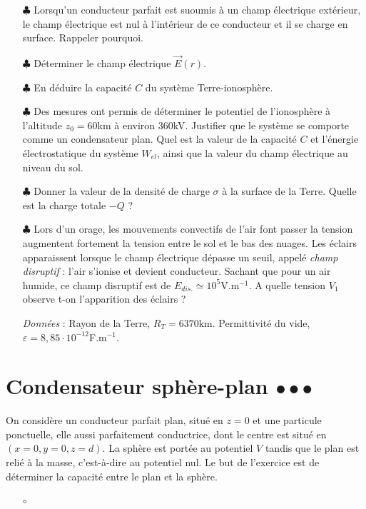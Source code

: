 \documentclass{report}
\begin{document}
\begin{itemize}

	\item[$\clubsuit$] Lorsqu'un conducteur parfait est suoumis à un champ électrique extérieur, le champ électrique est nul à l'intérieur de ce conducteur et il se charge en surface. Rappeler pourquoi.
	
	\item[$\clubsuit$] Déterminer le champ électrique $\vec{E}(r)$.
		
	\item[$\clubsuit$] En déduire la capacité $C$ du système Terre-ionosphère.
	
	\item[$\clubsuit$] Des mesures ont permis de déterminer le potentiel de l'ionosphère à l'altitude $z_0=60$km à environ 360kV. Justifier que le système se comporte comme un condensateur plan. Quel est la valeur de la capacité $C$ et l'énergie électrostatique du système $W_{el}$, ainsi que la valeur du champ électrique au niveau du sol.
	
	\item[$\clubsuit$] Donner la valeur de la densité de charge $\sigma$ à la surface de la Terre. Quelle est la charge totale $-Q$ ?
	
	\item[$\clubsuit$] Lors d'un orage, les mouvements convectifs de l'air font passer la tension augmentent fortement la tension entre le sol et le bas des nuages. Les éclairs apparaissent lorsque le champ électrique dépasse un seuil, appelé \textit{champ disruptif} : l'air s'ionise et devient conducteur. Sachant que pour un air humide, ce champ disruptif est de $E_{dis.}\simeq10^{5}$V.m$^{-1}$. A quelle tension $V_1$ observe t-on l'apparition des éclairs ?
	
	
	\textit{Données} : Rayon de la Terre, $R_T=6370$km. Permittivité du vide, $\varepsilon=8,85\cdot10^{-12}$F.m$^{-1}$.
	
\end{itemize}

\newpage

\section*{Condensateur sphère-plan $\bullet\bullet\bullet$}

On considère un conducteur parfait plan, situé en $z=0$ et une particule ponctuelle, elle aussi parfaitement conductrice, dont le centre est situé en $(x=0, y=0, z=d)$. La sphère est portée au potentiel $V$ tandis que le plan est relié à la masse, c'est-à-dire au potentiel nul. Le but de l'exercice est de déterminer la capacité entre le plan et la sphère.

\begin{itemize}

	\item[$\circ$] 

\end{itemize}

\newpage
\end{document}
